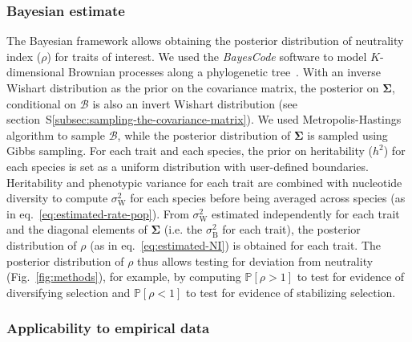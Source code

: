 \documentclass{article}
\newcommand{\UniDimArray}[1]{\bm{#1}}
\newcommand{\BiDimArray}[1]{\bm{#1}}
\newcommand{\proba}{\mathbb{P}}
\newcommand{\Heritability}{h^2}
\newcommand{\RateBetween}{\sigma^2_{\mathrm{B}}}
\newcommand{\RateWhithin}{\sigma^2_{\mathrm{W}}}
\newcommand{\NI}{\rho}
\newcommand{\Ntrait}{K}
\newcommand{\Covariancematrix}{\Sigma}
\newcommand{\CovarianceMatrix}{\BiDimArray{\Covariancematrix}}
\newcommand{\brownian}{\mathcal{B}}
\newcommand{\Brownian}{\UniDimArray{\brownian}}
\begin{document}
\subsubsection*{Bayesian estimate}
The Bayesian framework allows obtaining the posterior distribution of neutrality index ($\NI$) for traits of interest.
We used the \textit{BayesCode} software to model $\Ntrait$-dimensional Brownian processes along a phylogenetic tree~\citep{latrille_inferring_2021}.
With an inverse Wishart distribution as the {prior} on the covariance matrix, the {posterior} on $\CovarianceMatrix$, conditional on $\brownian$ is also an invert Wishart distribution (see section~S\ref{subsec:sampling-the-covariance-matrix}).
We used Metropolis-Hastings algorithm to sample $\Brownian$, while the posterior distribution of $\CovarianceMatrix$ is sampled using Gibbs sampling.
For each trait and each species, the prior on heritability ($\Heritability$) for each species is set as a uniform distribution with user-defined boundaries.
Heritability and phenotypic variance for each trait are combined with nucleotide diversity to compute $\RateWhithin$ for each species before being averaged across species (as in eq.~\ref{eq:estimated-rate-pop}).
From $\RateWhithin$ estimated independently for each trait and the diagonal elements of $\CovarianceMatrix$ (i.e. the $\RateBetween$ for each trait), the posterior distribution of $\NI$ (as in eq.~\ref{eq:estimated-NI}) is obtained for each trait.
The posterior distribution of $\NI$ thus allows testing for deviation from neutrality (Fig.~\ref{fig:methods}), for example, by computing $\proba [\NI > 1 ]$ to test for evidence of diversifying selection and $\proba [\NI < 1 ]$ to test for evidence of stabilizing selection.

\subsubsection*{Applicability to empirical data}
\end{document}
